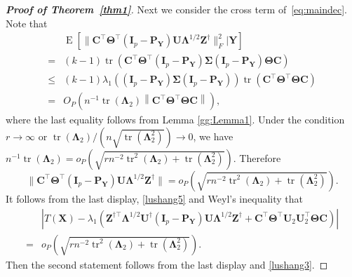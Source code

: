 \documentclass[12pt]{article} %
\DeclareMathOperator{\mytr}{tr}
\DeclareMathOperator{\myE}{E}
\newcommand{\bZ}{\mathbf{Z}}
\newcommand{\bX}{\mathbf{X}}
\newcommand{\bP}{\mathbf{P}}
\newcommand{\bY}{\mathbf{Y}}
\newcommand{\bC}{\mathbf{C}}
\newcommand{\bI}{\mathbf{I}}
\newcommand{\bU}{\mathbf{U}}
\newcommand{\bfsym}[1]{\ensuremath{\boldsymbol{#1}}}
\def\bLambda {\bfsym {\Lambda}}
\def\bSigma {\bfsym {\Sigma}}
\def\bTheta {\bfsym {\Theta}}
\theoremstyle{definition}
\begin{document}
\begin{appendices}
\begin{proof}[\textbf{Proof of Theorem~\ref{thm1}}]
Next we consider the cross term of~\eqref{eq:maindec}. Note that
$$
\begin{aligned}
    & \myE [\|\bC^\top \bTheta^\top (\bI_p -\bP_{\bY})\bU\bLambda^{1/2}\bZ^\dagger\|_F^2|\bY]
    \\
    = &
    (k-1)\mytr(\bC^\top \bTheta^\top (\bI_p -\bP_{\bY})\bSigma (\bI_p -\bP_{\bY})\bTheta \bC)\\
    \leq &
    (k-1)
    \lambda_1\left((\bI_p -\bP_{\bY})\bSigma (\bI_p -\bP_{\bY})\right)
    \mytr(\bC^\top \bTheta^\top  \bTheta \bC)\\
    =&
    O_P\left(
    n^{-1}\mytr(\bLambda_2)
    \left\|\bC^\top \bTheta^\top  \bTheta \bC\right\|
\right),
\end{aligned}
$$
where the last equality follows from Lemma \ref{gg:Lemma1}.
Under the condition $r\to \infty$ or $\mytr(\bLambda_2)/(n \sqrt{\mytr(\bLambda_2^2)})\to 0$, we have
$n^{-1}\mytr(\bLambda_2)=o_P\left(\sqrt{
        rn^{-2} \mytr^2 (\bLambda_2) + \mytr(\bLambda_2^2)
}\right)$.
Therefore
\begin{equation*}
\|\bC^\top \bTheta^\top (\bI_p -\bP_{\bY})\bU\bLambda^{1/2}\bZ^\dagger\|=
o_P\left(
\sqrt{
        rn^{-2} \mytr^2 (\bLambda_2) + \mytr(\bLambda_2^2)
}
\right)
.
\end{equation*}
It follows from the last display, \eqref{lushang5} and Weyl's inequality that
\begin{equation*}
    \begin{split}
    &\left|
    T(\bX)
    -
    \lambda_1\left(
        \bZ^{\dagger\top} \bLambda^{1/2} \bU^\dagger (\bI_p-\bP_\bY) \bU \bLambda^{1/2} \bZ^\dagger 
        +
        \bC^\top \bTheta^\top \bU_2 \bU_2^\top \bTheta \bC
    \right)
    \right|
    \\
    =&
o_P\left(
\sqrt{
        rn^{-2} \mytr^2 (\bLambda_2) + \mytr(\bLambda_2^2)
}
\right).
    \end{split}
\end{equation*}
Then the second statement follows from the last display and \eqref{lushang3}.

\end{proof}


\end{appendices}
\end{document}
